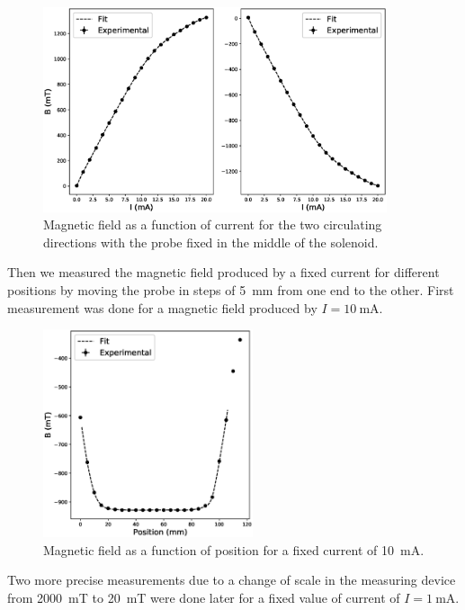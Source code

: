 \documentclass[11pt,a4paper]{article}
\begin{document}
\begin{figure}[H]
\centering
\includegraphics[width=0.9\textwidth]{B_diff_current.eps}
\caption{Magnetic field as a function of current for the two circulating directions with the probe fixed in the middle of the solenoid.}
\label{fig:BvsI}
\end{figure}

Then we measured the magnetic field produced by a fixed current for different positions by moving the probe in steps of \SI{5}{\mm} from one end to the other. First measurement was done for a magnetic field produced by $I=\SI{10}{\mA}$.

\begin{figure}[H]
\centering
\includegraphics[width=0.55\textwidth]{B_diff_position1.eps}
\caption{Magnetic field as a function of position for a fixed current of \SI{10}{\mA}.}
\label{fig:BvsPos1}
\end{figure}

Two more precise measurements due to a change of scale in the measuring device from \SI{2000}{mT} to \SI{20}{mT} were done later for a fixed value of current of $I=\SI{1}{\mA}$.
\end{document}
